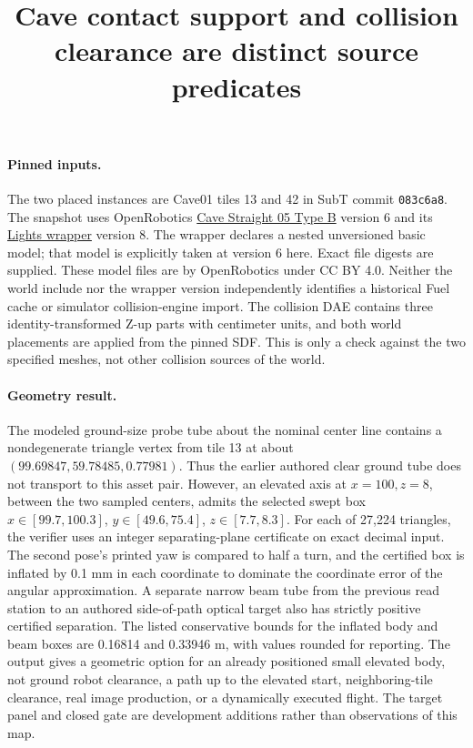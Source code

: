 \documentclass{article}
\begin{document}
\title{Cave contact support and collision clearance are distinct source predicates}
\maketitle

\paragraph{Pinned inputs.}
The two placed instances are Cave01 tiles 13 and 42 in SubT
commit \texttt{083c6a8}. The snapshot uses OpenRobotics
\href{https://fuel.gazebosim.org/1.0/OpenRobotics/models/Cave\%20Straight\%2005\%20Type\%20B}{Cave Straight 05 Type B}
version 6 and its
\href{https://fuel.gazebosim.org/1.0/OpenRobotics/models/Cave\%20Straight\%2005\%20Lights\%20Type\%20B}{Lights wrapper}
version 8. The wrapper declares a nested unversioned basic
model; that model is explicitly taken at version 6 here.
Exact file digests are supplied. These model files are by
OpenRobotics under CC BY 4.0. Neither the world include
nor the wrapper version independently identifies a historical
Fuel cache or simulator collision-engine import.
The collision DAE contains three identity-transformed
Z-up parts with centimeter units, and both world placements
are applied from the pinned SDF. This is only a check against
the two specified meshes, not other collision sources of the world.

\paragraph{Geometry result.}
The modeled ground-size probe tube about the nominal center
line contains a nondegenerate triangle vertex from tile 13
at about \((99.69847,59.78485,0.77981)\).
Thus the earlier authored clear ground tube does not
transport to this asset pair. However, an elevated axis at
\(x=100,z=8\), between the two sampled centers, admits the
selected swept box \(x\in[99.7,100.3]\),
\(y\in[49.6,75.4]\), \(z\in[7.7,8.3]\).
For each of 27,224 triangles, the verifier uses an integer
separating-plane certificate on exact decimal input.
The second pose's printed yaw is compared to half a turn,
and the certified box is inflated by 0.1 mm in each coordinate
to dominate the coordinate error of the angular approximation.
A separate narrow beam tube from the previous read station
to an authored side-of-path optical target also has strictly
positive certified separation. The listed conservative bounds
for the inflated body and beam boxes are 0.16814 and 0.33946 m,
with values rounded for reporting. The output gives a geometric
option for an already positioned small elevated body, not
ground robot clearance, a path up to the elevated start,
neighboring-tile clearance, real image production, or a
dynamically executed flight. The target panel and closed gate
are development additions rather than observations of this map.
\end{document}

